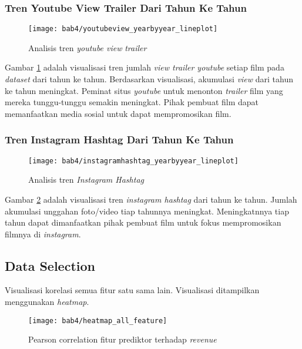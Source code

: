 \subsubsection{Tren Youtube View Trailer Dari Tahun Ke Tahun}

\begin{figure}[H]
	\centering  
	\texttt{[image: bab4/youtubeview\_yearbyyear\_lineplot]}   
	\caption{Analisis tren\textit{ youtube view} \textit{trailer}}
	\label{fig:youtubeview_yearbyyear_lineplot} 
\end{figure} 

Gambar \ref{fig:youtubeview_yearbyyear_lineplot} adalah visualisasi tren jumlah \textit{view trailer youtube} setiap film pada \textit{dataset} dari tahun ke tahun. Berdasarkan visualisasi, akumulasi \textit{view} dari tahun ke tahun meningkat. Peminat situs \textit{youtube} untuk menonton \textit{trailer} film yang mereka tunggu-tunggu semakin meningkat. Pihak pembuat film dapat memanfaatkan media sosial untuk dapat mempromosikan film.

\subsubsection{Tren Instagram Hashtag Dari Tahun Ke Tahun}
\begin{figure}[H]
	\centering  
	\texttt{[image: bab4/instagramhashtag\_yearbyyear\_lineplot]}   
	\caption{Analisis tren\textit{ Instagram Hashtag }}	\label{fig:instagramhashtag_yearbyyear_lineplot} 
\end{figure} 

Gambar \ref{fig:instagramhashtag_yearbyyear_lineplot} adalah visualisasi tren \textit{instagram hashtag} dari tahun ke tahun. Jumlah akumulasi unggahan foto/video tiap tahunnya meningkat. Meningkatnnya tiap tahun dapat dimanfaatkan pihak pembuat film untuk fokus  mempromosikan filmnya di  \textit{instagram}.

\subsection{Data Selection} 
Visualisasi korelasi semua fitur satu sama lain. Visualisasi ditampilkan menggunakan \textit{heatmap}.

 
\begin{figure}[H]
	\centering  
	\texttt{[image: bab4/heatmap\_all\_feature]}   
	\caption{Pearson correlation fitur prediktor terhadap \textit{revenue}}	\label{fig:heatmap_all_feature} 
\end{figure}

